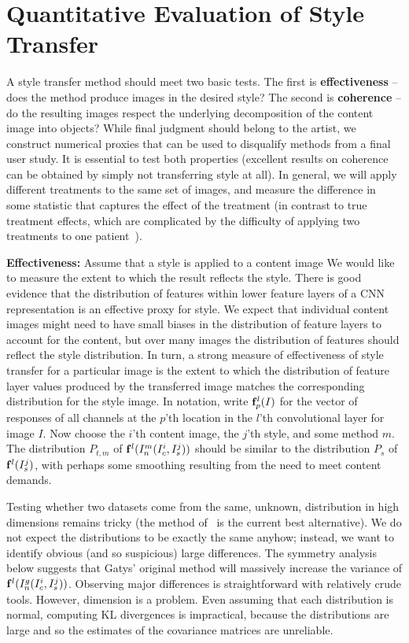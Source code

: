 \documentclass[runningheads]{llncs}
\newcommand{\vect}[1]{{\bf {#1}}}
\begin{document}
\section{Quantitative Evaluation of Style Transfer}

A style transfer method should meet two basic tests.  The first is {\bf effectiveness} -- does the
method produce images in the desired style? The second is {\bf coherence} -- do the resulting images respect the
underlying decomposition of the content image into objects?   While final judgment should belong to the artist, we
construct numerical proxies that can be used to disqualify methods from a final user study. It is essential to test both
properties (excellent results on coherence can be obtained by simply not transferring style at all).
In general, we will apply different treatments to the same set of images, and measure the difference in some statistic that captures the
effect of the treatment (in contrast to true treatment effects, which are complicated by the difficulty of applying two treatments to one patient~\cite{SIM:SIM893}).   

{\bf Effectiveness:}  Assume that a style is applied to a content image  We would like to measure the extent to which the result reflects the style.  There is good evidence that the distribution of features within lower feature layers of a CNN representation is an effective proxy for style.  We expect that individual content images might need to have small biases in the distribution of feature layers to account for the content, but over many images the distribution of features should reflect the style distribution.  In turn, a strong measure of effectiveness of style transfer for a particular image is the extent to which the distribution of feature layer values produced by the transferred image matches the corresponding distribution for the style image. In notation, write $\vect{f}^{l}_{p}(I)$ for the vector of responses  of all channels  at the  $p$'th location in the $l$'th convolutional layer for image $I$. Now choose the $i$'th content image, the $j$'th style, and some method $m$.  The distribution $P_{t, m}$ of $\vect{f}^{l}(I^m_n(I_c^i,I_s^j))$ should be similar to  the distribution $P_s$ of $\vect{f}^{l}(I_s^j)$, with perhaps some smoothing  resulting from the need to meet content demands.   

Testing whether two datasets come from the same, unknown, distribution in high dimensions remains tricky (the method of~\cite{gretton2012kernel} is the current best alternative).  We do not expect the distributions to be exactly the same anyhow;  instead, we want to identify obvious (and so suspicious) large  differences. The symmetry analysis below suggests that Gatys' original method will massively increase the variance of  $\vect{f}^{l}(I^g_n(I_c^i,I_s^j))$.  Observing major differences is straightforward with relatively crude tools.   However, dimension is a problem.  Even assuming that each distribution is normal,  computing KL divergences is impractical, because the distributions are large and so the estimates of the covariance matrices are unreliable.   
\end{document}

